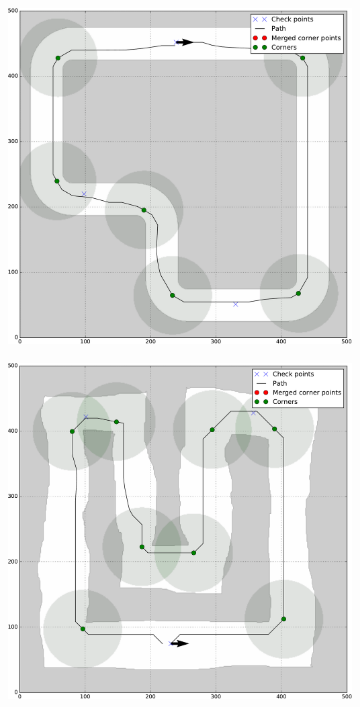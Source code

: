 \begin{figure}[]%
	\centering
	\begin{subfigure}[b]{0.49\textwidth}%
		\centering
		\includegraphics[width=\textwidth]{../img/corner_detection_simple}
		\caption{}
	\end{subfigure}
	\hfill
	\begin{subfigure}[b]{0.49\textwidth}
		\centering
		\includegraphics[width=\textwidth]{../img/corner_detection_handdrawn}

\end{subfigure}
\end{figure}
